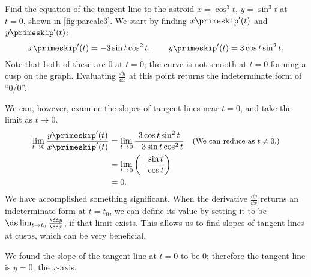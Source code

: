 \begin{example}\label{ex_parcalc3}%
Find the equation of the tangent line to the astroid $x=\cos^3 t$, $y=\sin^3t$ at $t=0$, shown in \autoref{fig:parcalc3}.
\solution
We start by finding $x\primeskip'(t)$ and $y\primeskip'(t)$:
%
%
\[x\primeskip'(t) = -3\sin t\cos^2t, \qquad y\primeskip'(t) = 3\cos t\sin^2t.\]
Note that both of these are 0 at $t=0$; the curve is not smooth at $t=0$ forming a cusp on the graph. Evaluating $\frac{\dd y}{\dd x}$ at this point returns the indeterminate form of ``0/0''. 

We can, however, examine the slopes of tangent lines near $t=0$, and take the limit as $t\to 0$. 
\begin{align*}
	\lim_{t\to0} \frac{y\primeskip'(t)}{x\primeskip'(t)}
	&=\lim_{t\to0} \frac{3\cos t\sin^2t}{-3\sin t\cos^2t}
	\quad \text{\small (We can reduce as $t\neq 0$.)}\\
	&= \lim_{t\to0}\left(-\frac{\sin t}{\cos t}\right)\\
	&= 0.
\end{align*}
We have accomplished something significant. When the derivative $\frac{\dd y}{\dd x}$ returns an indeterminate form at $t=t_0$, we can define its value by setting it to be $\ds \lim_{t\to t_0}\frac{\dd y}{\dd x}$, if that limit exists. This allows us to find slopes of tangent lines at cusps, which can be very beneficial. 

We found the slope of the tangent line at $t=0$ to be 0; therefore the tangent line is $y=0$, the $x$-axis.
\end{example}

